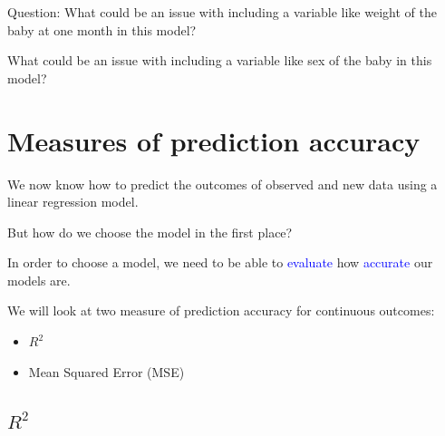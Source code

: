 \documentclass[10pt,t]{beamer}
\begin{document}
\begin{frame}
	Question: What could be an issue with including a variable like weight of the baby at one month in this model?
	\bigskip
	
	What could be an issue with including a variable like sex of the baby in this model?
	
\end{frame}





\section{Measures of prediction accuracy}

\begin{frame}
 We now know how to predict the outcomes of observed and new data using a linear regression model.
 
 \bigskip
 
 But how do we choose the model in the first place?
 
 \bigskip
 
 In order to choose a model, we need to be able to \textcolor{blue}{evaluate} how \textcolor{blue}{accurate} our models are.
 
 \bigskip
 
 We will look at two measure of prediction accuracy for continuous outcomes:
 \medskip
 \begin{itemize}
 	\item $R^2$
 	\smallskip
 	\item Mean Squared Error (MSE)
 \end{itemize}
 
\end{frame}

\subsection{$R^2$}
\end{document}
